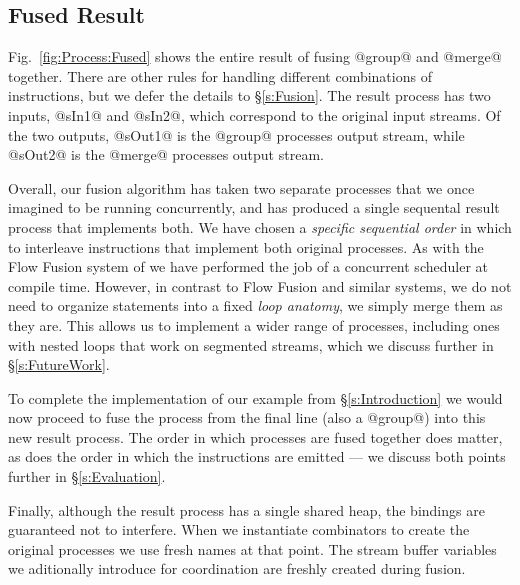 \subsection{Fused Result}

Fig.~\ref{fig:Process:Fused} shows the entire result of fusing @group@ and @merge@ together. There are other rules for handling different combinations of instructions, but we defer the details to \S\ref{s:Fusion}. The result process has two inputs, @sIn1@ and @sIn2@, which correspond to the original input streams. Of the two outputs, @sOut1@ is the @group@ processes output stream, while @sOut2@ is the @merge@ processes output stream. 

Overall, our fusion algorithm has taken two separate processes that we once imagined to be running concurrently, and has produced a single sequental result process that implements both. We have chosen a \emph{specific sequential order} in which to interleave instructions that implement both original processes. As with the Flow Fusion system of \cite{lippmeier2013data} we have performed the job of a concurrent scheduler at compile time. However, in contrast to Flow Fusion and similar systems, we do not need to organize statements into a fixed \emph{loop anatomy}, we simply merge them as they are. This allows us to implement a wider range of processes, including ones with nested loops that work on segmented streams, which we discuss further in \S\ref{s:FutureWork}. 

To complete the implementation of our example from \S\ref{s:Introduction} we would now proceed to fuse the process from the final line (also a @group@) into this new result process. The order in which processes are fused together does matter, as does the order in which the instructions are emitted --- we discuss both points further in \S\ref{s:Evaluation}.

Finally, although the result process has a single shared heap, the bindings are guaranteed not to interfere. When we instantiate combinators to create the original processes we use fresh names at that point. The stream buffer variables we aditionally introduce for coordination are freshly created during fusion.




